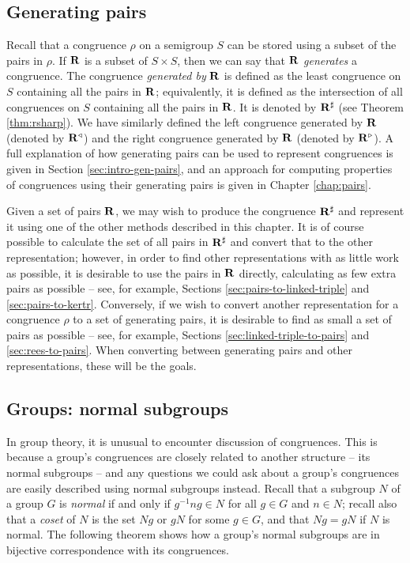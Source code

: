 \subsection{Generating pairs}
\label{sec:converting-pairs}
Recall that a congruence $\rho$ on a semigroup $S$ can be stored using
a subset of the pairs in $\rho$.  If $\mathbf{R}$ is a subset of $S \times S$,
then we can say that $\mathbf{R}$ \textit{generates} a congruence.  The
congruence \textit{generated by} $\mathbf{R}$ is defined as the least congruence
on $S$ containing all the pairs in $\mathbf{R}$; equivalently, it is defined as
the intersection of all congruences on $S$ containing all the pairs in
$\mathbf{R}$.  It is denoted by $\mathbf{R}^\sharp$ (see Theorem
\ref{thm:rsharp}).  We have similarly defined the left congruence generated by
$\mathbf{R}$ (denoted by $\mathbf{R}^\triangleleft$) and the right congruence
generated by $\mathbf{R}$ (denoted by $\mathbf{R}^\triangleright$).
A full explanation of how generating pairs can be used to represent congruences
is given in Section \ref{sec:intro-gen-pairs}, and an approach for computing
properties of congruences using their generating pairs is given in Chapter
\ref{chap:pairs}.

Given a set of pairs $\mathbf{R}$, we may wish to produce the congruence
$\mathbf{R}^\sharp$ and represent it using one of the other methods described in
this chapter.  It is of course possible to calculate the set of all pairs in
$\mathbf{R}^\sharp$ and convert that to the other representation; however, in
order to find other representations with as little work as possible, it is
desirable to use the pairs in $\mathbf{R}$ directly, calculating as few extra
pairs as possible -- see, for example, Sections \ref{sec:pairs-to-linked-triple}
and \ref{sec:pairs-to-kertr}.  Conversely, if we wish to convert another
representation for a congruence $\rho$ to a set of generating pairs, it is
desirable to find as small a set of pairs as possible -- see, for example,
Sections \ref{sec:linked-triple-to-pairs} and \ref{sec:rees-to-pairs}.  When
converting between generating pairs and other representations, these will be the
goals.

\subsection{Groups: normal subgroups}
\label{sec:normal-subgroups}

In group theory, it is unusual to encounter discussion of congruences.  This is
because a group's congruences are closely related to another structure -- its
normal subgroups -- and any questions we could ask about a group's congruences are
easily described using normal subgroups instead.  Recall that a subgroup $N$ of
a group $G$ is \textit{normal} if and only if $g^{-1}ng \in N$ for all $g \in G$
and $n \in N$; recall also that a \textit{coset} of $N$ is the set $Ng$ or $gN$
for some $g \in G$, and that $Ng=gN$ if $N$ is normal.  The following theorem
shows how a group's normal subgroups are in bijective correspondence with its
congruences.

